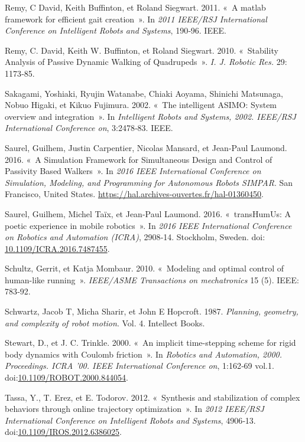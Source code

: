 \documentclass[french,A4paper,]{book}
\begin{document}
\hypertarget{ref-remy11}{}
Remy, C David, Keith Buffinton, et Roland Siegwart. 2011. «~A matlab
framework for efficient gait creation~». In \emph{2011 IEEE/RSJ
International Conference on Intelligent Robots and Systems}, 190‑96.
IEEE.

\hypertarget{ref-remy10}{}
Remy, C. David, Keith W. Buffinton, et Roland Siegwart. 2010.
«~Stability Analysis of Passive Dynamic Walking of Quadrupeds~».
\emph{I. J. Robotic Res.} 29: 1173‑85.

\hypertarget{ref-sakagami02}{}
Sakagami, Yoshiaki, Ryujin Watanabe, Chiaki Aoyama, Shinichi Matsunaga,
Nobuo Higaki, et Kikuo Fujimura. 2002. «~The intelligent ASIMO: System
overview and integration~». In \emph{Intelligent Robots and Systems,
2002. IEEE/RSJ International Conference on}, 3:2478‑83. IEEE.

\hypertarget{ref-saurel16}{}
Saurel, Guilhem, Justin Carpentier, Nicolas Mansard, et Jean-Paul
Laumond. 2016. «~A Simulation Framework for Simultaneous Design and
Control of Passivity Based Walkers~». In \emph{2016 IEEE International
Conference on Simulation, Modeling, and Programming for Autonomous
Robots SIMPAR}. San Francisco, United States.
\href{\%20https://hal.archives-ouvertes.fr/hal-01360450\%20}{https://hal.archives-ouvertes.fr/hal-01360450}.

\hypertarget{ref-transhumus}{}
Saurel, Guilhem, Michel Taïx, et Jean-Paul Laumond. 2016. «~transHumUs:
A poetic experience in mobile robotics~». In \emph{2016 IEEE
International Conference on Robotics and Automation (ICRA)}, 2908‑14.
Stockholm, Sweden.
doi:\href{https://doi.org/\%2010.1109/ICRA.2016.7487455\%20}{ 10.1109/ICRA.2016.7487455}.

\hypertarget{ref-schultz10}{}
Schultz, Gerrit, et Katja Mombaur. 2010. «~Modeling and optimal control
of human-like running~». \emph{IEEE/ASME Transactions on mechatronics}
15 (5). IEEE: 783‑92.

\hypertarget{ref-schwartz87}{}
Schwartz, Jacob T, Micha Sharir, et John E Hopcroft. 1987.
\emph{Planning, geometry, and complexity of robot motion}. Vol. 4.
Intellect Books.

\hypertarget{ref-stewart00}{}
Stewart, D., et J. C. Trinkle. 2000. «~An implicit time-stepping scheme
for rigid body dynamics with Coulomb friction~». In \emph{Robotics and
Automation, 2000. Proceedings. ICRA '00. IEEE International Conference
on}, 1:162‑69 vol.1.
doi:\href{https://doi.org/10.1109/ROBOT.2000.844054}{10.1109/ROBOT.2000.844054}.

\hypertarget{ref-tassa12}{}
Tassa, Y., T. Erez, et E. Todorov. 2012. «~Synthesis and stabilization
of complex behaviors through online trajectory optimization~». In
\emph{2012 IEEE/RSJ International Conference on Intelligent Robots and
Systems}, 4906‑13.
doi:\href{https://doi.org/10.1109/IROS.2012.6386025}{10.1109/IROS.2012.6386025}.
\end{document}

